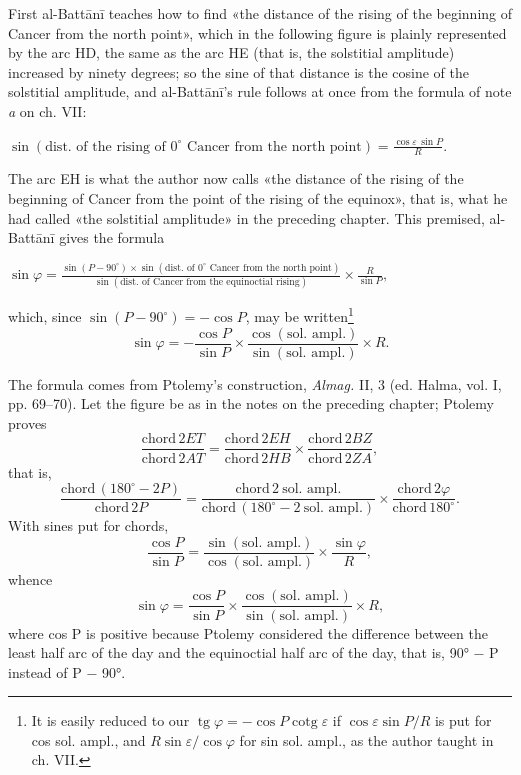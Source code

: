 \documentclass[11pt]{article}
\begin{document}
\par First al-Battānī teaches how to find «the distance of the rising of the beginning of Cancer from the north point», which in the following figure is plainly represented by the arc HD, the same as the arc HE (that is, the solstitial amplitude) increased by ninety degrees; so the sine of that distance is the cosine of the solstitial amplitude, and al-Battānī's rule follows at once from the formula of note \emph{a} on ch. VII: \par\noindent\hspace*{1.5em}$\displaystyle \sin(\text{dist. of the rising of }0^\circ\text{ Cancer from the north point}) = \frac{\cos\varepsilon\,\sin P}{R}.$\par The arc EH is what the author now calls «the distance of the rising of the beginning of Cancer from the point of the rising of the equinox», that is, what he had called «the solstitial amplitude» in the preceding chapter. This premised, al-Battānī gives the formula \par\noindent\hspace*{1.5em}$\displaystyle \sin\varphi = \frac{\sin(P - 90^\circ) \times \sin(\text{dist. of }0^\circ\text{ Cancer from the north point})}{\sin(\text{dist. of Cancer from the equinoctial rising})} \times \frac{R}{\sin P},$\par which, since $\sin(P - 90^\circ) = -\cos P$, may be written\footnote{It is easily reduced to our $\operatorname{tg}\varphi = -\cos P \operatorname{cotg}\varepsilon$ if $\cos\varepsilon \sin P / R$ is put for cos sol. ampl., and $R \sin\varepsilon / \cos\varphi$ for sin sol. ampl., as the author taught in ch. VII.} \[ \sin\varphi = -\frac{\cos P}{\sin P} \times \frac{\cos(\text{sol. ampl.})}{\sin(\text{sol. ampl.})} \times R. \]\par
\begin{center}\end{center}
\par The formula comes from Ptolemy's construction, \emph{Almag.} II, 3 (ed. Halma, vol. I, pp. 69–70). Let the figure be as in the notes on the preceding chapter; Ptolemy proves \[ \frac{\text{chord}\,2ET}{\text{chord}\,2AT} = \frac{\text{chord}\,2EH}{\text{chord}\,2HB} \times \frac{\text{chord}\,2BZ}{\text{chord}\,2ZA}, \] that is, \[ \frac{\text{chord}\,(180^\circ - 2P)}{\text{chord}\,2P} = \frac{\text{chord}\,2\ \text{sol. ampl.}}{\text{chord}\,(180^\circ - 2\ \text{sol. ampl.})} \times \frac{\text{chord}\,2\varphi}{\text{chord}\,180^\circ}. \] With sines put for chords, \[ \frac{\cos P}{\sin P} = \frac{\sin(\text{sol. ampl.})}{\cos(\text{sol. ampl.})} \times \frac{\sin\varphi}{R}, \] whence \[ \sin\varphi = \frac{\cos P}{\sin P} \times \frac{\cos(\text{sol. ampl.})}{\sin(\text{sol. ampl.})} \times R, \] where cos P is positive because Ptolemy considered the difference between the least half arc of the day and the equinoctial half arc of the day, that is, 90° − P instead of P − 90°.\par
\end{document}
